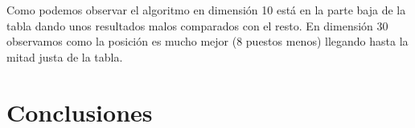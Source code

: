 \documentclass[12pt,a4paper]{article}
\begin{document}
	Como podemos observar el algoritmo en dimensión 10 está en la parte baja de la tabla dando unos resultados malos comparados con el resto. En dimensión 30 observamos como la posición es mucho mejor (8 puestos menos) llegando hasta la mitad justa de la tabla.
	
	\section{Conclusiones}
	
	
	
	
	
	\newpage
	\clearpage
	
\end{document}
